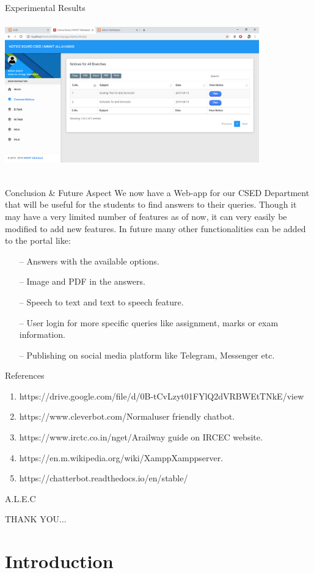 \documentclass{beamer}
\begin{document}
\begin{frame}{Experimental Results}
   \includegraphics[width=11cm, height=7cm]{s5.png}
   
\end{frame}
\begin{frame}{Conclusion \& Future Aspect}
We now have a Web-app for our CSED Department that will be useful for the students to find answers to their queries. Though it may have a very limited number of features as of now, it can very easily be modified to add new features.
\linebreak
In future many other functionalities can be added to the portal like:
\begin{itemize}
    \item[--] Answers with the available options.
    \item[--] Image and PDF in the answers.
    \item[--] Speech to text and text to speech feature.
    \item[--] User login for more specific queries like assignment, marks or exam information.
    \item[--] Publishing on social media platform like Telegram, Messenger etc.
\end{itemize}
\end{frame}

\begin{frame}{References}
    \begin{enumerate}
        \item 	https://drive.google.com/file/d/0B-tCvLzyt01FYlQ2dVRBWEtTNkE/view
        \item https://www.cleverbot.com/Normaluser friendly chatbot.
        \item https://www.irctc.co.in/nget/Arailway guide on IRCEC website.
        \item https://en.m.wikipedia.org/wiki/XamppXamppserver.
        \item https://chatterbot.readthedocs.io/en/stable/

    \end{enumerate}
     
\end{frame}
\begin{frame}{A.L.E.C}
    \begin{center}
      \LARGE{THANK YOU...}
      
    \end{center}
    
   
\end{frame}

\section{Introduction}
\end{document}
